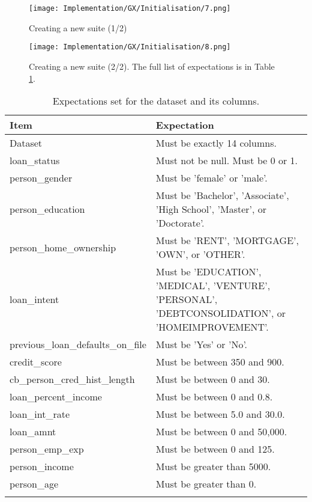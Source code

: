 \begin{figure}[H]
    \centering
    \texttt{[image: Implementation/GX/Initialisation/7.png]}
    \caption{Creating a new suite (1/2)}
    \label{fig:GXSuite1}
\end{figure}

\begin{figure}[H]
    \centering
    \texttt{[image: Implementation/GX/Initialisation/8.png]}
    \caption{Creating a new suite (2/2). The full list of expectations is in Table \ref{tab:Expectations}.}
    \label{fig:GXSuite2}
\end{figure}

\begin{longtable}{ | p{} | p{} |}
    \hline
    \cellcolor{blue!25}Item & \cellcolor{blue!25}Expectation\\
    \hline
    Dataset & Must be exactly 14 columns. \\
    \hline
    loan\_status & Must not be null. \newline Must be 0 or 1. \\
    \hline 
    person\_gender & Must be 'female' or 'male'. \\
    \hline 
    person\_education & Must be 'Bachelor', 'Associate', 'High School', 'Master', or 'Doctorate'. \\
    \hline
    person\_home\_ownership & Must be 'RENT', 'MORTGAGE', 'OWN', or 'OTHER'.\\
    \hline 
    loan\_intent & Must be 'EDUCATION', 'MEDICAL', 'VENTURE', 'PERSONAL', 'DEBTCONSOLIDATION', or 'HOMEIMPROVEMENT'.\\
    \hline 
    previous\_loan\_defaults\_on\_file & Must be 'Yes' or 'No'. \\
    \hline
    credit\_score & Must be between 350 and 900. \\
    \hline
    cb\_person\_cred\_hist\_length & Must be between 0 and 30. \\
    \hline
    loan\_percent\_income & Must be between 0 and 0.8. \\
    \hline
    loan\_int\_rate & Must be between 5.0 and 30.0. \\
    \hline
    loan\_amnt & Must be between 0 and 50,000. \\
    \hline 
    person\_emp\_exp & Must be between 0 and 125. \\
    \hline 
    person\_income & Must be greater than 5000. \\
    \hline 
    person\_age & Must be greater than 0. \\
    \hline
\caption{Expectations set for the dataset and its columns.}\label{tab:Expectations}
\end{longtable}

